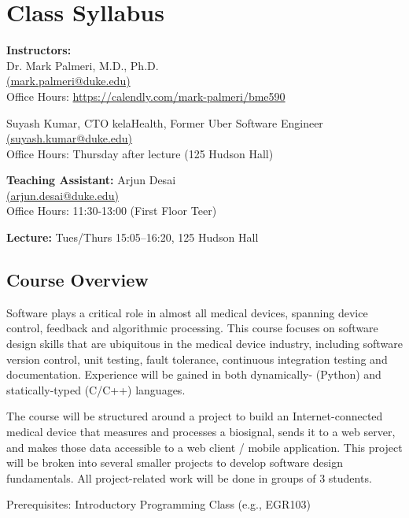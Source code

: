 



\section*{Class Syllabus}

{\bf Instructors:}\\
Dr. Mark Palmeri, M.D., Ph.D.\\
\href{mailto:mark.palmeri@duke.edu}{(mark.palmeri@duke.edu)}\\
Office Hours: \url{https://calendly.com/mark-palmeri/bme590} 

Suyash Kumar, CTO kelaHealth, Former Uber Software Engineer\\
\href{mailto:suyash.kumar@duke.edu}{(suyash.kumar@duke.edu)}\\
Office Hours: Thursday after lecture (125 Hudson Hall)

{\bf Teaching Assistant:}
Arjun Desai\\
\href{mailto:arjun.desai@duke.edu}{(arjun.desai@duke.edu)}\\
Office Hours: 11:30-13:00 (First Floor Teer)

{\bf Lecture:} Tues/Thurs 15:05--16:20, 125 Hudson Hall

\subsection*{Course Overview}
Software plays a critical role in almost all medical devices, spanning device control, feedback and algorithmic processing.  This course focuses on software design skills that are ubiquitous in the medical device industry, including software version control, unit testing, fault tolerance, continuous integration testing and documentation.  Experience will be gained in both dynamically- (Python) and statically-typed (C/C++) languages. 

The course will be structured around a project to build an Internet-connected medical device that measures and processes a biosignal, sends it to a web server, and makes those data accessible to a web client / mobile application.  This project will be broken into several smaller projects to develop software design fundamentals.  All project-related work will be done in groups of 3 students.

Prerequisites: Introductory Programming Class (e.g., EGR103)

